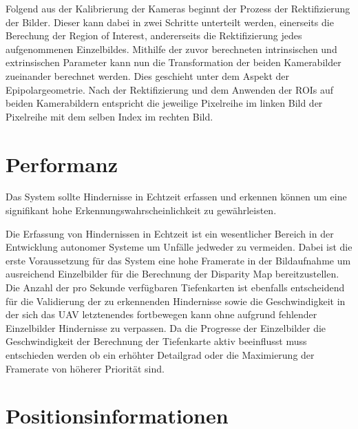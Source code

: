 \noindent
Folgend aus der Kalibrierung der Kameras beginnt der Prozess der Rektifizierung der Bilder. Dieser kann dabei in zwei Schritte unterteilt werden, einerseits die Berechung der Region of Interest, andererseits die Rektifizierung jedes aufgenommenen Einzelbildes. Mithilfe der zuvor berechneten intrinsischen und extrinsischen Parameter kann nun die Transformation der beiden Kamerabilder zueinander berechnet werden. Dies geschieht unter dem Aspekt der Epipolargeometrie. Nach der Rektifizierung und dem Anwenden der ROIs auf beiden Kamerabildern entspricht die jeweilige Pixelreihe im linken Bild der Pixelreihe mit dem selben Index im rechten Bild.\\

\section{Performanz}
\label{sec:performanz}

	\begin{anforderung}
	\label{req:performanz}
		Das System sollte Hindernisse in Echtzeit erfassen und erkennen können um eine signifikant hohe Erkennungswahrscheinlichkeit zu gewährleisten.
	\end{anforderung}

\noindent
Die Erfassung von Hindernissen in Echtzeit ist ein wesentlicher Bereich in der Entwicklung autonomer Systeme um Unfälle jedweder zu vermeiden. Dabei ist die erste Voraussetzung für das System eine hohe Framerate in der Bildaufnahme um ausreichend Einzelbilder für die Berechnung der Disparity Map bereitzustellen. Die Anzahl der pro Sekunde verfügbaren Tiefenkarten ist ebenfalls entscheidend für die Validierung der zu erkennenden Hindernisse sowie die Geschwindigkeit in der sich das UAV letztenendes fortbewegen kann ohne aufgrund fehlender Einzelbilder Hindernisse zu verpassen.
Da die Progresse der Einzelbilder die Geschwindigkeit der Berechnung der Tiefenkarte aktiv beeinflusst muss entschieden werden ob ein erhöhter Detailgrad oder die Maximierung der Framerate von höherer Priorität sind.
	

\section{Positionsinformationen}
\label{sec:positionsinformationen}

